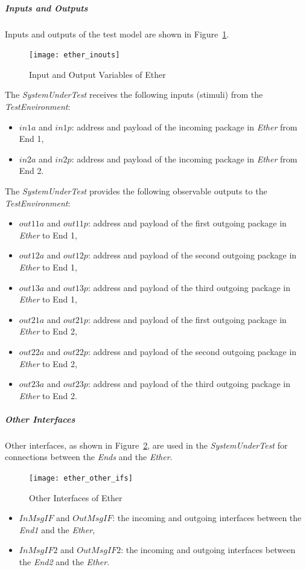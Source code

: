 \subparagraph{Inputs and Outputs}
Inputs and outputs of the test model are shown in Figure~\ref{fig:ether-inouts}.
\begin{figure}[htb!]
    \centering
    \texttt{[image: ether\_inouts]}
    \caption{Input and Output Variables of Ether}
    \label{fig:ether-inouts}
\end{figure}

The \emph{SystemUnderTest} receives the following inputs (stimuli) from the \emph{TestEnvironment}:
\begin{itemize}
    \item $in1a$ and $in1p$: address and payload of the incoming package in \emph{Ether} from End 1, 
    \item $in2a$ and $in2p$: address and payload of the incoming package in \emph{Ether} from End 2. 
\end{itemize}

The \emph{SystemUnderTest} provides the following observable outputs to the \emph{TestEnvironment}:
\begin{itemize}
    \item $out11a$ and $out11p$: address and payload of the first outgoing package in \emph{Ether} to End 1,
    \item $out12a$ and $out12p$: address and payload of the second outgoing package in \emph{Ether} to End 1,
    \item $out13a$ and $out13p$: address and payload of the third outgoing package in \emph{Ether} to End 1,
    \item $out21a$ and $out21p$: address and payload of the first outgoing package in \emph{Ether} to End 2,
    \item $out22a$ and $out22p$: address and payload of the second outgoing package in \emph{Ether} to End 2,
    \item $out23a$ and $out23p$: address and payload of the third outgoing package in \emph{Ether} to End 2. 
\end{itemize}

\subparagraph{Other Interfaces}
Other interfaces, as shown in Figure~\ref{fig:ether-other-ifs}, are used in the \emph{SystemUnderTest} for connections between the \emph{Ends} and the \emph{Ether}.
\begin{figure}[htb!]
    \centering
    \texttt{[image: ether\_other\_ifs]}
    \caption{Other Interfaces of Ether}
    \label{fig:ether-other-ifs}
\end{figure}

\begin{itemize}
    \item $InMsgIF$ and $OutMsgIF$: the incoming and outgoing interfaces between the \emph{End1} and the \emph{Ether}, 
    \item $InMsgIF2$ and $OutMsgIF2$: the incoming and outgoing interfaces between the \emph{End2} and the \emph{Ether}.
\end{itemize}

